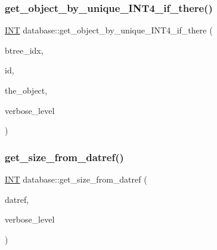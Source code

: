 \mbox{\label{classdatabase_a0d275df405adfb8ccfb78423cd722f4b}} 
\subsubsection{\texorpdfstring{get\+\_\+object\+\_\+by\+\_\+unique\+\_\+\+I\+N\+T4\+\_\+if\+\_\+there()}{get\_object\_by\_unique\_INT4\_if\_there()}}
{\footnotesize\ttfamily \mbox{\hyperlink{galois_8h_a09fddde158a3a20bd2dcadb609de11dc}{I\+NT}} database\+::get\+\_\+object\+\_\+by\+\_\+unique\+\_\+\+I\+N\+T4\+\_\+if\+\_\+there (\begin{DoxyParamCaption}\item[{\mbox{\hyperlink{galois_8h_a09fddde158a3a20bd2dcadb609de11dc}{I\+NT}}}]{btree\+\_\+idx,  }\item[{\mbox{\hyperlink{galois_8h_a09fddde158a3a20bd2dcadb609de11dc}{I\+NT}}}]{id,  }\item[{\mbox{\hyperlink{class_vector}{Vector}} \&}]{the\+\_\+object,  }\item[{\mbox{\hyperlink{galois_8h_a09fddde158a3a20bd2dcadb609de11dc}{I\+NT}}}]{verbose\+\_\+level }\end{DoxyParamCaption})}

\mbox{\label{classdatabase_ae71e4c19b07a2d67682fbd4b069e9a7e}} 
\subsubsection{\texorpdfstring{get\+\_\+size\+\_\+from\+\_\+datref()}{get\_size\_from\_datref()}}
{\footnotesize\ttfamily \mbox{\hyperlink{galois_8h_a09fddde158a3a20bd2dcadb609de11dc}{I\+NT}} database\+::get\+\_\+size\+\_\+from\+\_\+datref (\begin{DoxyParamCaption}\item[{\mbox{\hyperlink{galois_8h_ac94af6544c710549c9fca744fd510395}{U\+I\+N\+T4}}}]{datref,  }\item[{\mbox{\hyperlink{galois_8h_a09fddde158a3a20bd2dcadb609de11dc}{I\+NT}}}]{verbose\+\_\+level }\end{DoxyParamCaption})}

